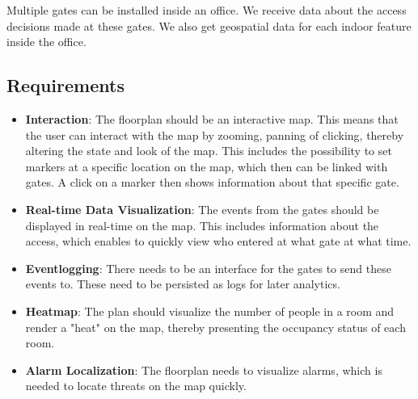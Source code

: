 Multiple gates can be installed inside an office. We receive data about the access decisions made at these gates. We also get geospatial data for each indoor feature inside the office.

\subsection{Requirements}

\begin{itemize}
    \item \textbf{Interaction}:
    The floorplan should be an interactive map. This means that the user can interact with the map by zooming, panning of clicking, thereby altering the state and look of the map. This includes the possibility to set markers at a specific location on the map, which then can be linked with gates. A click on a marker then shows information about that specific gate.
    \item \textbf{Real-time Data Visualization}:
     The events from the gates should be displayed in real-time on the map. This includes information about the access, which enables to quickly view who entered at what gate at what time.
    \item \textbf{Eventlogging}:
    There needs to be an interface for the gates to send these events to. These need to be persisted as logs for later analytics.
    \item \textbf{Heatmap}:
    The plan should visualize the number of people in a room and render a "heat" on the map, thereby presenting the occupancy status of each room.
    \item \textbf{Alarm Localization}:
    The floorplan needs to visualize alarms, which is needed to locate threats on the map quickly.
\end{itemize}

\clearpage




